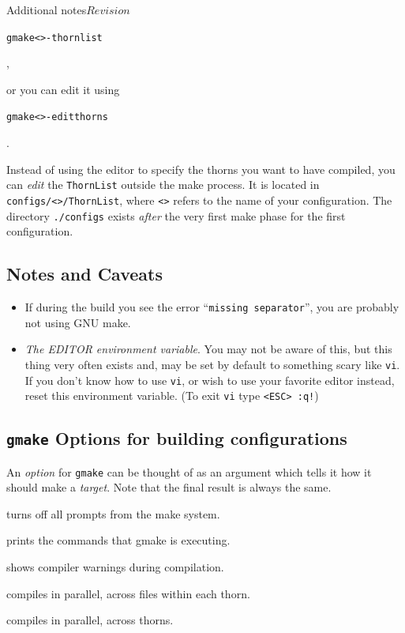 \begin{cactuspart}{Additional notes}{}{$Revision$}
\begin{alltt}
gmake <>-thornlist
\end{alltt},

or you can edit it using

\begin{alltt}
gmake <>-editthorns
\end{alltt}.

Instead of using the editor to specify the thorns you want to
  have compiled, you can \emph{edit} the \texttt{ThornList} outside
  the make process. It is located in \texttt{configs/<>/ThornList},
  where \texttt{<>} refers to the name of your configuration.
  The directory \texttt{./configs} exists \emph{ after} the very first
  make phase for the first configuration.

\subsection{Notes and Caveats}
\begin{itemize}
\item{} If during the build you see the error ``\texttt{missing
    separator}'', you are probably not using GNU make.
\item{} \textit{The EDITOR environment variable}. You may not be aware of
  this, but this thing very often exists and, may be set  by default to
  something scary like \texttt{vi}. If you don't know how to use \texttt{vi},
  or wish to
  use your favorite editor instead, reset this environment variable.
  (To exit \texttt{vi} type \texttt{<ESC> :q!})
\end{itemize}

\subsection{\texttt{gmake} Options for building configurations}
\label{sec:gmopfobuco}

An \textit{option} for \texttt{gmake} can be thought of as an argument which tells
it how it should make a \textit{target}. Note that the final result is always
the same.

\begin{Lentry}
\item [\texttt{gmake <\var{target}> PROMPT=no}] turns off all prompts from the
make system.
\item [\texttt{gmake <\var{target}> VERBOSE=yes}] prints the commands that
gmake is executing.
\item [\texttt{gmake <\var{target}> WARN=yes}] shows compiler warnings during
compilation.
\item [\texttt{gmake <\var{target}> FJOBS=<\var{number}>}] compiles in parallel,
across files within each thorn.
\item [\texttt{gmake <\var{target}> TJOBS=<\var{number}>}] compiles in parallel,
across thorns.


\end{Lentry}
\end{cactuspart}
